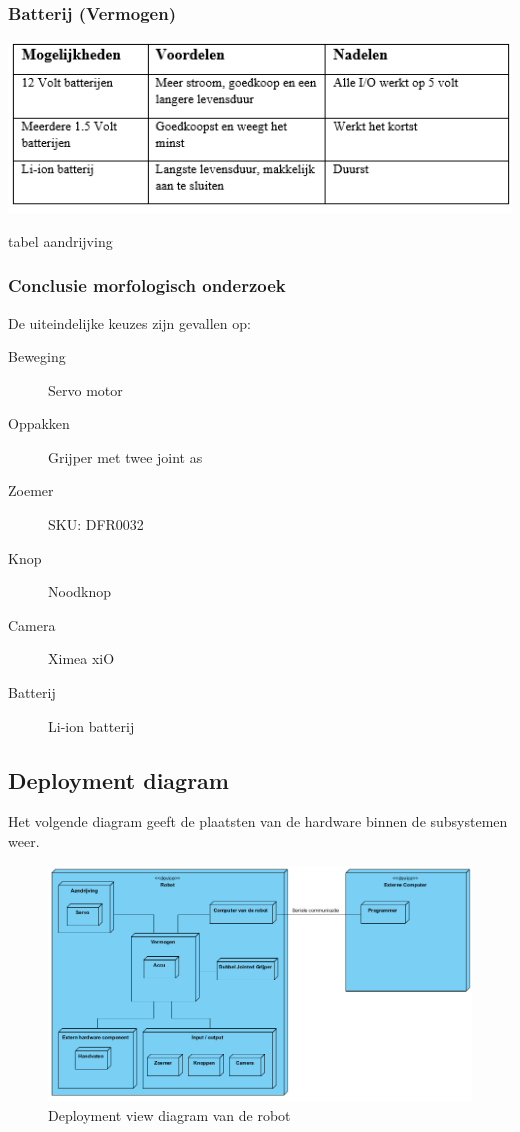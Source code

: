 \documentclass[12pt]{article} %
\begin{document}
\subsubsection{Batterij (Vermogen)}
\begin{center}
\begin{table}[h]
\includegraphics[scale=1.]{tabelBat.png}
\caption{tabel aandrijving}
\label{fig:deployment}
\end{table}
\end{center}
\subsubsection{Conclusie morfologisch onderzoek}
De uiteindelijke keuzes zijn gevallen op:
\begin{description}
\item[Beweging] Servo motor
\item[Oppakken] Grijper met twee joint as
\item[Zoemer] SKU: DFR0032
\item[Knop] Noodknop
\item[Camera] Ximea xiO
\item[Batterij] Li-ion batterij
\end{description}
\clearpage

\subsection{Deployment diagram}
Het volgende diagram geeft de plaatsten van de hardware binnen de subsystemen weer.
\begin{center}
\begin{figure}[h]
\includegraphics[scale=.65]{deployment.png}
\caption{Deployment view diagram van de robot}
\label{fig:deployment}
\end{figure}
\end{center}
\clearpage
\newpage%
\end{document}

